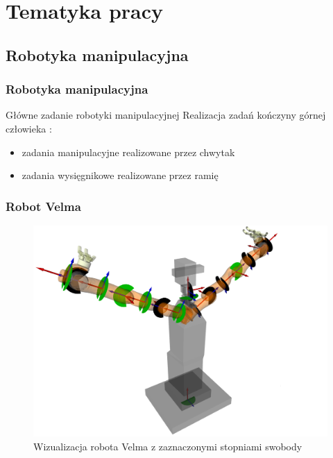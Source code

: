 \section{Tematyka pracy}

\subsection{Robotyka manipulacyjna}

\begin{frame}
\frametitle{Robotyka manipulacyjna}
\begin{block}{Główne zadanie robotyki manipulacyjnej}
Realizacja zadań kończyny górnej człowieka \cite{siewruk}:
\begin{itemize}
	\item zadania manipulacyjne realizowane przez chwytak
	\item zadania wysięgnikowe realizowane przez ramię
\end{itemize}
\end{block}
\end{frame}


\begin{frame}
\frametitle{Robot Velma}
\begin{figure}
\includegraphics[scale=0.22]{./images/velma_joints.png}
\caption{Wizualizacja robota Velma z zaznaczonymi stopniami swobody \cite{docsVelma}}
\end{figure}
\end{frame}

